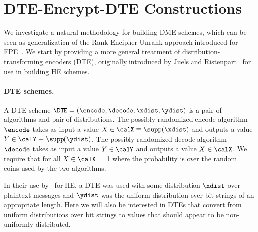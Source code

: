 \section{DTE-Encrypt-DTE Constructions}
\label{sec:gencons}


We investigate a natural methodology for building DME schemes, which can be seen
as generalization of the Rank-Encipher-Unrank approach introduced for
FPE~\cite{BRRS09}. We start by providing a more general treatment of 
distribution-transforming encoders (DTE), originally introduced by Juels and
Ristenpart~\cite{JR14} for use in building HE schemes. 

\paragraph{DTE schemes.} 
A DTE scheme $\DTE = (\encode,\decode,\xdist,\ydist)$ is a pair of algorithms
and pair of distributions.  The possibly
randomized encode algorithm $\encode$ takes as input a value $X \in \calX \equiv
\supp(\xdist)$ and outputs a value $Y \in \calY \equiv \supp(\ydist)$. 
The possibly randomized decode algorithm $\decode$ takes as input a value $Y\in\calY$ and
outputs a value $X\in\calX$. We require that for all $X \in \calX$  
\bnm
   = 1 
\enm
where the probability is over the random coins used by the two algorithms.

In their use by~\cite{JR14} for HE, a DTE was used with  
some distribution $\xdist$ over plaintext messages and $\ydist$ was the uniform distribution over
bit strings of an appropriate length. Here we will also be interested in
DTEs that convert from uniform distributions over bit strings to values that should
appear to be non-uniformly distributed. 

